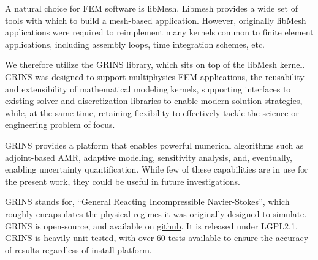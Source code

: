 A natural choice for FEM software is 
libMesh\cite{libMeshPaper}. Libmesh provides a wide set of tools with
which to build a mesh-based application. However, originally libMesh
applications were required to reimplement many kernels common to finite
element applications, including assembly loops, time integration
schemes, etc.  

We therefore utilize the GRINS library\cite{GRINSpaper}, which sits on
top of the libMesh kernel. GRINS was designed to support multiphysics FEM
applications, the reusability and extensibility of mathematical
modeling kernels, supporting interfaces to existing solver and
discretization libraries to enable modern solution strategies, while, at
the same time, retaining flexibility to effectively tackle the science
or engineering problem of focus. 

GRINS provides a platform that enables powerful numerical algorithms
such as adjoint-based AMR, adaptive modeling, sensitivity analysis,
and, eventually, enabling uncertainty quantification. While few of these
capabilities are in use for the present work, they could be useful in
future investigations. 

GRINS stands for, ``General Reacting Incompressible Navier-Stokes'',
which roughly encapsulates the physical regimes it was originally
designed to simulate. GRINS is open-source, and available on
\hyperref[www.github.com/grinsfem/grins]{github}. It is released 
under LGPL2.1.  GRINS is heavily unit tested, with over 60 tests
available to ensure the accuracy of results regardless of install platform.






